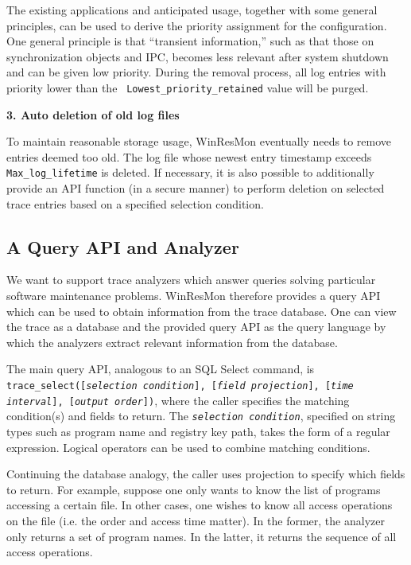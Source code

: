 The existing applications and anticipated usage, together with some general
principles, can be used to derive the priority assignment for the
configuration.  One general principle is that ``transient information,'' such as that
those on synchronization objects and IPC, becomes less relevant after
system shutdown and can be given low priority.  During the removal
process, all log entries with priority lower than the {\tt
Lowest\_priority\_retained} value will be purged.

\noindent
{\bf 3. Auto deletion of old log files}

To maintain reasonable storage usage, WinResMon eventually needs to remove
entries deemed too old.  The log file whose newest entry timestamp exceeds
{\tt Max\_log\_lifetime} is deleted.  If necessary, it is also possible to
additionally provide an API function (in a secure manner) to perform deletion
on selected trace entries based on a specified selection condition.


\subsection{A Query API and Analyzer}
\label{sect:queryapi}

We want to support trace analyzers which answer queries solving particular
software maintenance problems.  WinResMon therefore provides a query API which can be 
used to obtain information from the trace database.  
One can view the trace as a database and the provided query API as the query
language by which the analyzers extract relevant information from the
database.

The main query API, analogous to an SQL Select command, is
{\small\tt trace\_select([{\it selection condition}], [{\it field projection}],
[{\it time interval}], [{\it output order}])}, where the caller specifies
the matching condition(s) and fields to return.  The {\small\tt {\it selection
condition}}, specified on string types such as program name and registry key
path, takes the form of a regular expression.  Logical operators can be used
to combine matching conditions.

Continuing the database analogy, the caller uses projection to specify
which fields to return.  For example, suppose one only wants to know the list
of programs accessing a certain file.  In other cases, one wishes to know
all access operations on the file (i.e. the order and access time matter).
In the former, the analyzer only returns a set of program names.  In the
latter, it returns the sequence of all access operations.

